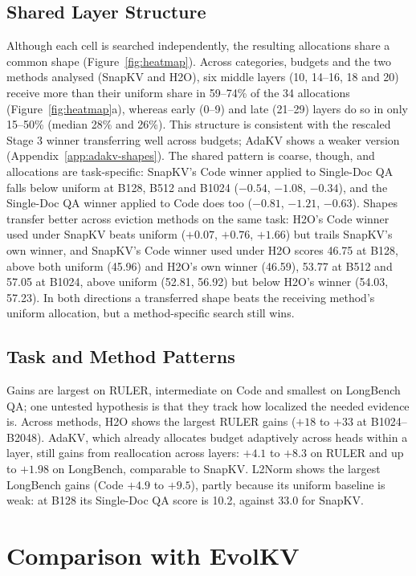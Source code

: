 \documentclass[11pt]{article}
\begin{document}
\subsection{Shared Layer Structure}
\label{sec:shared}

Although each cell is searched independently, the resulting allocations share a common shape (Figure~\ref{fig:heatmap}). Across categories, budgets and the two methods analysed (SnapKV and H2O), six middle layers (10, 14--16, 18 and 20) receive more than their uniform share in 59--74\% of the 34 allocations (Figure~\ref{fig:heatmap}a), whereas early (0--9) and late (21--29) layers do so in only 15--50\% (median 28\% and 26\%). This structure is consistent with the rescaled Stage 3 winner transferring well across budgets; AdaKV shows a weaker version (Appendix~\ref{app:adakv-shapes}). The shared pattern is coarse, though, and allocations are task-specific: SnapKV's Code winner applied to Single-Doc QA falls below uniform at B128, B512 and B1024 ($-0.54$, $-1.08$, $-0.34$), and the Single-Doc QA winner applied to Code does too ($-0.81$, $-1.21$, $-0.63$). Shapes transfer better across eviction methods on the same task: H2O's Code winner used under SnapKV beats uniform ($+0.07$, $+0.76$, $+1.66$) but trails SnapKV's own winner, and SnapKV's Code winner used under H2O scores 46.75 at B128, above both uniform (45.96) and H2O's own winner (46.59), 53.77 at B512 and 57.05 at B1024, above uniform (52.81, 56.92) but below H2O's winner (54.03, 57.23). In both directions a transferred shape beats the receiving method's uniform allocation, but a method-specific search still wins.

\subsection{Task and Method Patterns}

Gains are largest on RULER, intermediate on Code and smallest on LongBench QA; one untested hypothesis is that they track how localized the needed evidence is. Across methods, H2O shows the largest RULER gains ($+18$ to $+33$ at B1024--B2048). AdaKV, which already allocates budget adaptively across heads within a layer, still gains from reallocation across layers: $+4.1$ to $+8.3$ on RULER and up to $+1.98$ on LongBench, comparable to SnapKV. L2Norm shows the largest LongBench gains (Code $+4.9$ to $+9.5$), partly because its uniform baseline is weak: at B128 its Single-Doc QA score is 10.2, against 33.0 for SnapKV.

\section{Comparison with EvolKV}
\end{document}
